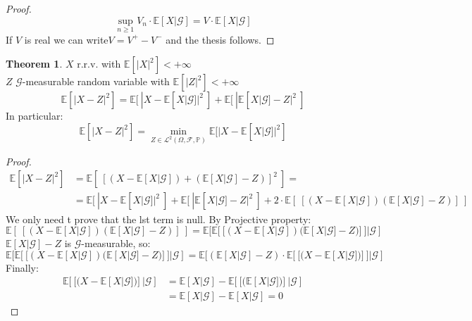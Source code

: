 \documentclass[10pt,a4paper]{article}
\theoremstyle{definition}
\newtheorem{teo}{Theorem}[section]
\begin{document}
\begin{enumerate}
\begin{proof}
\begin{equation*}
	\sup_{n\geq 1}V_n\cdot \mathbb{E}[X|\mathcal{G}] =
	V\cdot \mathbb{E}[X|\mathcal{G}]
\end{equation*} 
If $V$ is real we can write$V=V^{+}-V^{-}$ and the thesis follows.
\end{proof}
\begin{teo}
$X$ r.r.v. with $\mathbb{E}[|X|^2]<+\infty $\\
$Z$ $\mathcal{G}$-measurable random variable with $\mathbb{E}[|Z|^2]<+\infty$\\
\begin{equation*}
	\mathbb{E}[|X-Z|^2]=\mathbb{E}[\ |X-\mathbb{E}[X|\mathcal{G}]|^2\ ]+\mathbb{E}[\ |\mathbb{E}[X|\mathcal{G}]-Z|^2\ ]
\end{equation*}
In particular:
\begin{equation*}
	\mathbb{E}[|X-Z|^2]=\min_{Z\in\mathcal{L}^2(\Omega,\mathcal{F},\mathbb{P})}\mathbb{E}[|X-\mathbb{E}[X|\mathcal{G}]|^2]
\end{equation*}
\end{teo}
\begin{proof}
	\begin{equation*}
		\begin{split}
			\mathbb{E}[|X-Z|^2]&=\mathbb{E}[\ [(X-\mathbb{E}[X|\mathcal{G}])+(\mathbb{E}[X|\mathcal{G}]-Z)]^2\ ]=\\
			&=\mathbb{E}[\ |X-\mathbb{E}[X|\mathcal{G}]|^2\ ]+\mathbb{E}[\ |\mathbb{E}[X|\mathcal{G}]-Z|^2\ ]+2\cdot\mathbb{E}[\ [(X-\mathbb{E}[X|\mathcal{G}])(\mathbb{E}[X|\mathcal{G}]-Z)]\ ]
		\end{split}		
	\end{equation*}
We only need t prove that the lst term is null.
By Projective property:
\begin{equation*}
\mathbb{E}[\ [(X-\mathbb{E}[X|\mathcal{G}])(\mathbb{E}[X|\mathcal{G}]-Z)]\ ]=
\mathbb{E}[\mathbb{E}[\ [(X-\mathbb{E}[X|\mathcal{G}])(\mathbb{E}[X|\mathcal{G}]-Z)]\ ]|\mathcal{G}]
\end{equation*}
$\mathbb{E}[X|\mathcal{G}]-Z$ is $\mathcal{G}$-measurable, so:
\begin{equation*}
	\mathbb{E}[\mathbb{E}[\ [(X-\mathbb{E}[X|\mathcal{G}])(\mathbb{E}[X|\mathcal{G}]-Z)]\ ]|\mathcal{G}]=
	\mathbb{E}[(\mathbb{E}[X|\mathcal{G}]-Z)\cdot\mathbb{E}[\ [(X-\mathbb{E}[X|\mathcal{G}])]\ ]|\mathcal{G}]
\end{equation*}
Finally:
\begin{equation*}
	\begin{split}
		\mathbb{E}[\ [(X-\mathbb{E}[X|\mathcal{G}])]\ |\mathcal{G}]&=\mathbb{E}[X|\mathcal{G}]-\mathbb{E}[\ [(\mathbb{E}[X|\mathcal{G}])]\ |\mathcal{G}]\\
		&=\mathbb{E}[X|\mathcal{G}]-\mathbb{E}[X|\mathcal{G}]=0
	\end{split}
\end{equation*}
\end{proof}
\end{enumerate}
\end{document}
